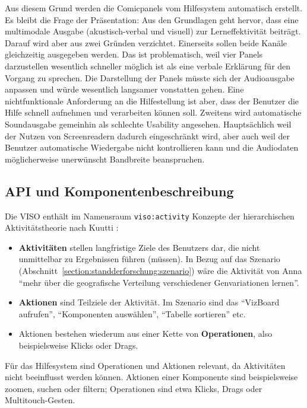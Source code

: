 \documentclass[
	headsepline,
	footsepline,
	fontsize=12pt,
	bibliography=totoc
]{scrbook}
\begin{document}
Aus diesem Grund werden die Comicpanels vom Hilfesystem automatisch erstellt. Es bleibt die Frage der Präsentation: Aus den Grundlagen geht hervor, dass eine multimodale Ausgabe (akustisch-verbal und visuell) zur Lerneffektivität beiträgt. Darauf wird aber aus zwei Gründen verzichtet. Einerseits sollen beide Kanäle gleichzeitig ausgegeben werden. Das ist problematisch, weil vier Panels darzustellen wesentlich schneller möglich ist als eine verbale Erklärung für den Vorgang zu sprechen. Die Darstellung der Panels müsste sich der Audioausgabe anpassen und würde wesentlich langsamer vonstatten gehen. Eine nichtfunktionale Anforderung an die Hilfestellung ist aber, dass der Benutzer die Hilfe schnell aufnehmen und verarbeiten können soll. Zweitens wird automatische Soundausgabe gemeinhin als schlechte Usability angesehen. Hauptsächlich weil der Nutzen von Screenreadern dadurch eingeschränkt wird, aber auch weil der Benutzer automatische Wiedergabe nicht kontrollieren kann und die Audiodaten möglicherweise unerwünscht Bandbreite beanspruchen.


\subsection{API und Komponentenbeschreibung}
\label{section:konzeption:bedienung:api}


Die VISO enthält im Namensraum \texttt{viso:activity} Konzepte der hierarchischen Aktivitätstheorie nach Kuutti \cite{Kuutti1996}:

\begin{itemize}
	\item \textbf{Aktivitäten} stellen langfristige Ziele des Benutzers dar, die nicht unmittelbar zu Ergebnissen führen (müssen). In Bezug auf das Szenario (Abschnitt~\ref{section:standderforschung:szenario}) wäre die Aktivität von Anna \enquote{mehr über die geografische Verteilung verschiedener Genvariationen lernen}.
	\item \textbf{Aktionen} sind Teilziele der Aktivität. Im Szenario sind das \enquote{VizBoard aufrufen}, \enquote{Komponenten auswählen}, \enquote{Tabelle sortieren} etc.
	\item Aktionen bestehen wiederum aus einer Kette von \textbf{Operationen}, also beispielsweise Klicks oder Drags.
\end{itemize}

Für das Hilfesystem sind Operationen und Aktionen relevant, da Aktivitäten nicht beeinflusst werden können. Aktionen einer Komponente sind beispielsweise zoomen, suchen oder filtern; Operationen sind etwa Klicks, Drags oder Multitouch-Gesten.
\end{document}
